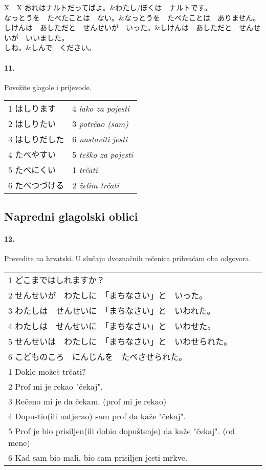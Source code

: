 \documentclass[12pt]{article}
\begin{document}
	\begin{tabularx}{\textwidth}{X　X}
		おれはナルトだってばよ。&わたし/ぼくは　ナルトです。\\
		なっとうを　たべたことは　ない。&なっとうを　たべたことは　ありません。\\
		しけんは　あしただと　せんせいが　いった。&しけんは　あしただと　せんせいが　いいました。\\
		しね。&しんで　ください。\\
	\end{tabularx}

	\paragraph{11.} Povežite glagole i prijevode.
	
	\begin{tabularx}{\textwidth}{X X}
		1 はしります&4 \textit{lako za pojesti}\\
		2 はしりたい&3 \textit{potrčao (sam)}\\
		3 はしりだした&6 \textit{nastaviti jesti}\\
		4 たべやすい&5 \textit{teško za pojesti}\\
		5 たべにくい&1 \textit{trčati}\\
		6 たべつづける&2 \textit{želim trčati}\\
	\end{tabularx}

	\subsection{Napredni glagolski oblici}
	
	\paragraph{12.} Prevedite na hrvatski. U slučaju dvoznačnih rečenica prihvaćam oba odgovora.
	
	\begin{tabularx}{\textwidth}{X}
		1 どこまではしれますか？\\
		2 せんせいが　わたしに　「まちなさい」と　いった。\\
		3 わたしは　せんせいに　「まちなさい」と　いわれた。\\
		4 わたしは　せんせいに　「まちなさい」と　いわせた。\\
		5 せんせいは　わたしに　「まちなさい」と　いわせられた。\\
		6 こどものころ　にんじんを　たべさせられた。\\
		1 Dokle možeš trčati?\\
		2 Prof mi je rekao "čekaj".\\
		3 Rečeno mi je da čekam. (prof mi je rekao)\\
		4 Dopustio(ili natjerao) sam prof da kaže "čekaj".\\
		5 Prof je bio prisiljen(ili dobio dopuštenje) da kaže "čekaj". (od mene)\\
		6 Kad sam bio mali, bio sam prisiljen jesti mrkve.\\
	\end{tabularx}
\end{document}
